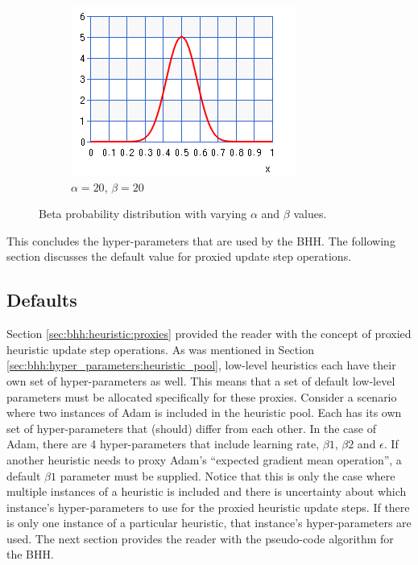 \begin{figure}[htbp]
      \begin{subfigure}{0.5\textwidth}
            \centering
            \includegraphics[width=\textwidth]{images/beta_20_20.png}
            \caption{$\alpha=20$, $\beta=20$}
            \label{sec:bhh:hyper_parameters:normalisation_beta_20_20}
      \end{subfigure}
      \par\bigskip
      \caption{Beta probability distribution with varying $\alpha$ and $\beta$ values.}
      \label{sec:bhh:hyper_parameters:discounted_rewards:normalisation}
\end{figure}

This concludes the hyper-parameters that are used by the \ac{BHH}. The following section discusses the default value for proxied update step operations.

\subsection{Defaults}
\label{sec:bhh:hyper_parameters:defaults}

Section \ref{sec:bhh:heuristic:proxies} provided the reader with the concept of proxied heuristic update step operations. As was mentioned in Section \ref{sec:bhh:hyper_parameters:heuristic_pool}, low-level heuristics each have their own set of hyper-parameters as well. This means that a set of default low-level parameters must be allocated specifically for these proxies. Consider a scenario where two instances of \ac{Adam} is included in the heuristic pool. Each has its own set of hyper-parameters that (should) differ from each other. In the case of \ac{Adam}, there are 4 hyper-parameters that include learning rate, $\beta1$, $\beta2$ and $\epsilon$. If another heuristic needs to proxy \ac{Adam}'s ``expected gradient mean operation'', a default $\beta1$ parameter must be supplied. Notice that this is only the case where multiple instances of a heuristic is included and there is uncertainty about which instance's hyper-parameters to use for the proxied heuristic update steps. If there is only one instance of a particular heuristic, that instance's hyper-parameters are used. The next section provides the reader with the pseudo-code algorithm for the \ac{BHH}.

